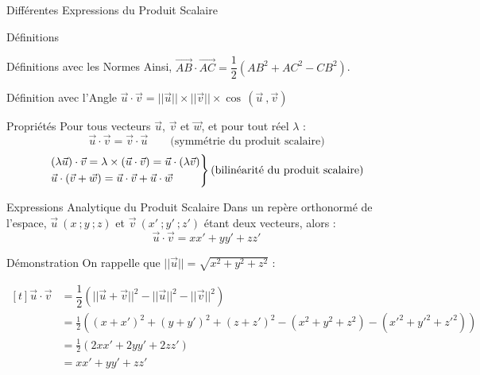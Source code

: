 \documentclass{coursbook}
\begin{document}
\begin{Gpartie}{Différentes Expressions du Produit Scalaire}
\begin{Spartie}{Définitions}
\begin{SSpartie}{Définitions avec les Normes}
                Ainsi, $\overrightarrow{AB}\cdot\overrightarrow{AC}=\dfrac{1}{2}\left(AB^2+AC^2-CB^2\right)$.
            \end{SSpartie}
            \begin{SSpartie}{Définition avec l'Angle} 
                $\vec{u}\cdot\vec{v}=\lvert\lvert\vec{u}\rvert\rvert\times\lvert\lvert\vec{v}\rvert\rvert\times\cos\,\left(\vec{u}~,\vec{v}\right)$
            \end{SSpartie}
        \end{Spartie}
        \begin{Spartie}{Propriétés} 
            Pour tous vecteurs $\vec{u}$, $\vec{v}$ et $\vec{w}$, et pour tout réel $\lambda$ : \[\vec{u}\cdot\vec{v}=\vec{v}\cdot\vec{u}\qquad\text{(symmétrie du produit scalaire)}\] \[\begin{drcases}\left(\lambda\vec{u}\right)\cdot\vec{v}=\lambda\times\left(\vec{u}\cdot\vec{v}\right)=\vec{u}\cdot\left(\lambda\vec{v}\right) \\ \vec{u}\cdot\left(\vec{v}+\vec{w}\right)=\vec{u}\cdot\vec{v}+\vec{u}\cdot\vec{w}\end{drcases}\text{(bilinéarité du produit scalaire)}\]
        \end{Spartie}
        \begin{Spartie}{Expressions Analytique du Produit Scalaire} 
            Dans un repère orthonormé de l'espace, $\vec{u}~\left(x~;y~;z\right)$ et $\vec{v}~\left(x'~;y'~;z'\right)$ étant deux vecteurs, alors : \[\vec{u}\cdot\vec{v}=xx'+yy'+zz'\] 
            \begin{SSpartie}{Démonstration} 
                On rappelle que $\lvert\lvert\vec{u}\rvert\rvert=\sqrt{x^2+y^2+z^2}$ :

                $\begin{aligned}[t]
                    \vec{u}\cdot\vec{v}&=\dfrac{1}{2}\left(\lvert\lvert\vec{u}+\vec{v}\rvert\rvert^2-\lvert\lvert\vec{u}\rvert\rvert^2-\lvert\lvert\vec{v}\rvert\rvert^2\right) \\
                    &=\frac{1}{2}\left(\left(x+x'\right)^2+\left(y+y'\right)^2+\left(z+z'\right)^2-\left(x^2+y^2+z^2\right)-\left(x'^2+y'^2+z'^2\right)\right) \\
                    &=\frac{1}{2}\left(2xx'+2yy'+2zz'\right) \\
                    &=xx'+y y'+z z'
                \end{aligned}$
            \end{SSpartie}
        \end{Spartie}
    \end{Gpartie}
\end{document}

